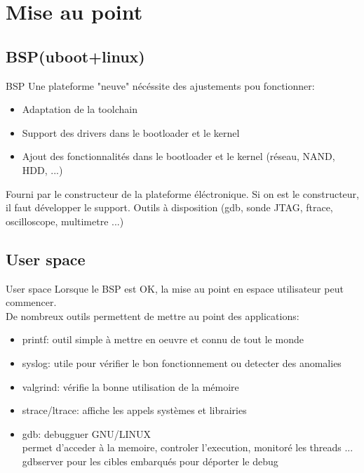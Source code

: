 \section{Mise au point}

\subsection{BSP(uboot+linux)}
\begin{frame}{BSP}{}
	Une plateforme "neuve" nécéssite des ajustements pou fonctionner:
	\begin{itemize}
		\item
			Adaptation de la toolchain
		\item
			Support des drivers dans le bootloader et le kernel
		\item
			Ajout des fonctionnalités dans le bootloader et le kernel (réseau, NAND, HDD, ...)
	\end{itemize}
	Fourni par le constructeur de la plateforme éléctronique.
	Si on est le constructeur, il faut développer le support.
	Outils à disposition (gdb, sonde JTAG, ftrace, oscilloscope, multimetre ...) 
\end{frame}
			
\subsection{User space}
\begin{frame}{User space}{}
	Lorsque le BSP est OK, la mise au point en espace utilisateur peut commencer.\\
	De nombreux outils permettent de mettre au point des applications:
	\begin{itemize}
		\item
			printf: outil simple à mettre en oeuvre et connu de tout le monde
		\item
			syslog: utile pour vérifier le bon fonctionnement ou detecter des anomalies
		\item
			valgrind: vérifie la bonne utilisation de la mémoire
		\item
			strace/ltrace: affiche les appels systèmes et librairies
		\item
			gdb: debugguer GNU/LINUX\\
			permet d'acceder à la memoire, controler l'execution, monitoré les threads ...\\
			gdbserver pour les cibles embarqués pour déporter le debug
	\end{itemize}
\end{frame}
